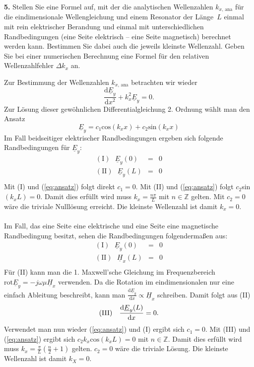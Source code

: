 \documentclass[Protokollheft.tex]{subfiles}
\begin{document}
	\begin{framed}
		\noindent \textbf{5.} Stellen Sie eine Formel auf, mit der die analytischen Wellenzahlen $k_{x,\,\text{ana}}$ für die eindimensionale Wellengleichung und
		einem Resonator der Länge~\(L\) einmal mit rein elektrischer Berandung und einmal mit unterschiedlichen Randbedingungen
		(eine Seite elektrisch -- eine Seite magnetisch) berechnet werden kann. Bestimmen Sie dabei auch die jeweils kleinste Wellenzahl.
		Geben Sie bei einer numerischen Berechnung eine Formel für den relativen Wellenzahlfehler $\Delta k_{x}$ an.\label{exer:kxAnalytic}
	\end{framed}
	\noindent
	Zur Bestimmung der Wellenzahlen $k_{x,\,\text{ana}}$ betrachten wir wieder 
	\begin{equation*}
		\frac{\text{d}\underline{E}_y}{\text{d}x^2}+k^2_x\underline{E}_y=0.
	\end{equation*}
	Zur Lösung dieser gewöhnlichen Differentialgleichung 2. Ordnung wählt man den Ansatz
	\begin{equation}
	\label{eq:ansatz}
	\underline{E}_y=c_1 \text{cos}(k_xx)+c_2 \text{sin}(k_xx)
	\end{equation}
	Im Fall beidseitiger elektrischer Randbedingungen ergeben sich folgende Randbedingungen für $\underline{E}_y$:
	\begin{eqnarray*}
		(\text{I}) \ \ \ \underline{E}_y(0)&=&0\\
		(\text{II}) \ \ \ \underline{E}_y(L)&=&0\\
	\end{eqnarray*}
	Mit (I) und (\ref{eq:ansatz}) folgt direkt $c_1=0$. Mit (II) und (\ref{eq:ansatz}) folgt $c_2$sin$(k_xL)=0$. Damit dies erfüllt wird muss $k_x=\frac{n\pi}{L}$ mit $n \in\mathbb{Z}$ gelten. Mit $c_2=0$ wäre die triviale Nulllösung erreicht. Die kleinste Wellenzahl ist damit $k_x=0$.\\
	\\
	Im Fall, das eine Seite eine elektrische und eine Seite eine magnetische Randbedingung besitzt, sehen die Randbedingungen folgendermaßen aus:
	\begin{eqnarray*}
		(\text{I}) \ \ \ \underline{E}_y(0)&=&0\\
		(\text{II}) \ \ \ \underline{H}_x(L)&=&0\\
	\end{eqnarray*}
	Für (II) kann man die 1. Maxwell'sche Gleichung im Frequenzbereich $\text{rot}\underline{E}_y=-j\omega\mu \underline{H}_x$ verwenden. Da die Rotation im eindimensionalen nur eine einfach Ableitung beschreibt, kann man $\frac{\text{d}\underline{E}_y}{\text{d}x}\propto\underline{H}_x$ schreiben. Damit folgt aus (II)
	\begin{equation*}
		(\text{III}) \ \ \ \frac{\text{d}\underline{E}_y(L)}{\text{d}x}=0\\.
	\end{equation*}
	Verwendet man nun wieder (\ref{eq:ansatz}) und (I) ergibt sich $c_1=0$. Mit (III) und (\ref{eq:ansatz}) ergibt sich $c_2k_x\text{cos}(k_xL)=0$ mit $n \in\mathbb{Z}$. Damit dies erfüllt wird muss $k_x=\frac{\pi}{L}(\frac{n}{2}+1)$ gelten. $c_2=0$ wäre die triviale Lösung. Die kleinste Wellenzahl ist damit $k_X=0$.
	
\end{document}
